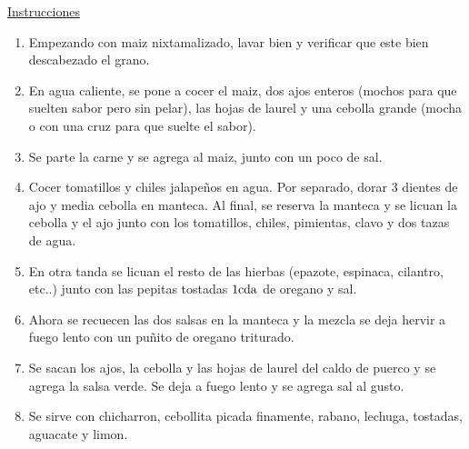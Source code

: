 \underline{Instrucciones}
\begin{enumerate}
\item Empezando con maiz nixtamalizado, lavar bien y verificar que este bien descabezado el grano. 
\item En agua caliente, se pone a cocer el maiz, dos ajos enteros (mochos para que suelten sabor pero sin pelar), las hojas de laurel y una cebolla grande (mocha o con una cruz para que suelte el sabor).
\item Se parte la carne y se agrega al maiz, junto con un poco de sal.
\item Cocer tomatillos y chiles jalapeños en agua. Por separado, dorar 3 dientes de ajo y media cebolla en manteca. Al final, se reserva la manteca y se licuan la cebolla y el ajo junto con los tomatillos, chiles, pimientas, clavo y dos tazas de agua. 
\item En otra tanda se licuan el resto de las hierbas (epazote, espinaca, cilantro, etc..) junto con las pepitas tostadas $1 \rm{cda}$ de oregano y sal. 
\item Ahora se recuecen las dos salsas en la manteca y la mezcla se deja hervir a fuego lento con un puñito de oregano triturado.
\item Se sacan los ajos, la cebolla y las hojas de laurel del caldo de puerco y se agrega la salsa verde. Se deja a fuego lento y se agrega sal al gusto.
\item Se sirve con chicharron, cebollita picada finamente, rabano, lechuga, tostadas, aguacate y limon.
\end{enumerate}

